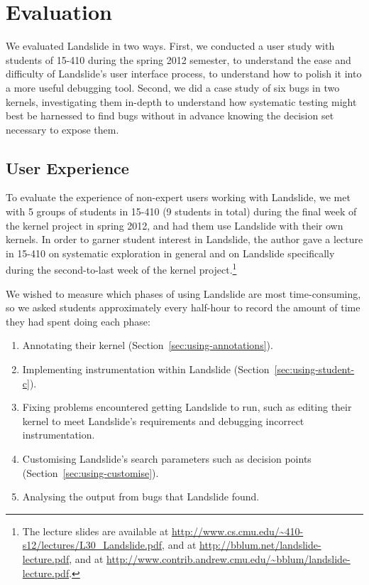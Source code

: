 \chapter{Evaluation}

We evaluated Landslide in two ways.
First, we conducted a user study with students of 15-410 during the spring 2012 semester, to understand the ease and difficulty of Landslide's user interface process, to understand how to polish it into a more useful debugging tool.
Second, we did a case study of six bugs in two kernels, investigating them in-depth to understand how systematic testing might best be harnessed to find bugs without in advance knowing the decision set necessary to expose them.

\section{User Experience}
\label{sec:eval-studence}

To evaluate the experience of non-expert users working with Landslide, we met with 5 groups of students in 15-410 (9 students in total) during the final week of the kernel project in spring 2012, and had them use Landslide with their own kernels.
In order to garner student interest in Landslide, the author gave a lecture in 15-410 on systematic exploration in general and on Landslide specifically during the second-to-last week of the kernel project.\footnote{
The lecture slides are available at \url{http://www.cs.cmu.edu/~410-s12/lectures/L30_Landslide.pdf}, and at \url{http://bblum.net/landslide-lecture.pdf}, and at \url{http://www.contrib.andrew.cmu.edu/~bblum/landslide-lecture.pdf}.}

We wished to measure which phases of using Landslide are most time-consuming, so we asked students approximately every half-hour to record the amount of time they had spent doing each phase:

\begin{enumerate}
	\item Annotating their kernel (Section~\ref{sec:using-annotations}).
	\item Implementing instrumentation within Landslide (Section~\ref{sec:using-student-c}).
	\item Fixing problems encountered getting Landslide to run, such as editing their kernel to meet Landslide's requirements and debugging incorrect instrumentation.
	\item Customising Landslide's search parameters such as decision points (Section~\ref{sec:using-customise}).
	\item Analysing the output from bugs that Landslide found.
\end{enumerate}

